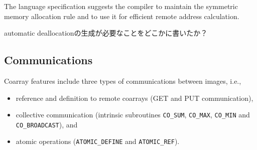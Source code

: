 %     

\requirement
The language specification suggests the compiler to maintain the symmetric memory
allocation rule and to use it for efficient remote address calculation.

automatic deallocationの生成が必要なことをどこかに書いたか？

\subsection{Communications}

Coarray features include three types of communications between images, i.e.,
\begin{itemize}
\item reference and definition to remote coarrays (GET and PUT communication),
\item collective communication (intrinsic subroutines {\tt CO\_SUM}, {\tt CO\_MAX}, 
{\tt CO\_MIN} and {\tt CO\_BROADCAST}), and
\item atomic operations ({\tt ATOMIC\_DEFINE} and {\tt ATOMIC\_REF}).
\end{itemize}

